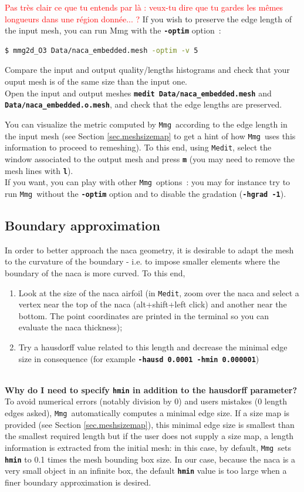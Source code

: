 \documentclass{article}
\newcommand{\ttb}[1]{\texttt{\textbf{#1}}}
\newcommand{\mmg}{\texttt{Mmg}}
\newcommand{\medit}{\texttt{Medit}}
\begin{document}
\textcolor{red}{Pas tr\`es clair ce que tu entends par l\`a : veux-tu dire que tu gardes les m\^emes longueurs dans une r\'egion donn\'ee... ?}
 If you wish to preserve the edge length of the input mesh, you can run Mmg with
the \ttb{-optim} option~:
\begin{lstlisting}[language=bash]
$ mmg2d_O3 Data/naca_embedded.mesh -optim -v 5
\end{lstlisting}
Compare the input and output quality/lengths histograms and check that
your ouput mesh is of the same size than the input one.\\

Open the input and output meshes \ttb{medit Data/naca\_embedded.mesh} and 
  \ttb{Data/naca\_embedded.o.mesh}, and check that the edge lengths are
preserved. 

You can visualize the metric computed by \mmg\ according to the edge length in the input mesh (see Section \ref{sec.meshsizemap} to get a hint of how \mmg\ uses this information to proceed to remeshing). 
To this end, using \medit, select the window associated to the output mesh and press \ttb{m} (you may need to
remove the mesh lines with \ttb{l}).\\

If you want, you can play with other \mmg\ options~: you may for instance try
to run \mmg\ without the \ttb{-optim} option and to disable the gradation
(\ttb{-hgrad -1}).

\subsection{Boundary approximation}\label{sec.hausd}
In order to better approach the naca geometry, it is desirable to adapt the mesh to the curvature of the boundary - i.e. to impose smaller elements where the boundary of the naca is more curved.
To this end,
\begin{enumerate}
\item Look at the size of the naca airfoil (in \medit, zoom over the
naca and select a vertex near the top of the naca (alt+shift+left
click) and another near the bottom. The point coordinates are printed
in the terminal so you can evaluate the naca thickness);
\item Try a hausdorff value related to this length and decrease the minimal edge
size in consequence (for example \ttb{-hausd 0.0001 -hmin 0.000001})
\end{enumerate}

\textbf{\\Why do I need to specify \ttb{hmin} in addition to the hausdorff parameter?\\}
To avoid numerical errors (notably division by 0) and users mistakes (0 length
edges asked), \mmg\ automatically computes a minimal edge size. If a
size map is provided (see Section \ref{sec.meshsizemap}), this minimal edge size is smallest than the
smallest required length but if the user does not supply a size map, a length information is extracted from the initial mesh: in this case,
by default, \mmg\ sets \ttb{hmin} to 0.1 times the mesh bounding box
size. In our case, because the naca is a very small object in an
infinite box, the default \ttb{hmin} value is too large when a finer boundary approximation is desired.
\end{document}
